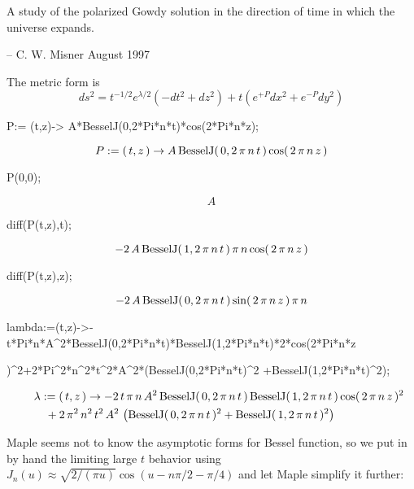 
A study of the polarized Gowdy solution in the direction of time in which the universe 
expands.

-- C. W. Misner   August 1997


The metric form is  
$$
   ds^2 = t^{-1/2} e^{\lambda/2}(-dt^2 + dz^2) 
         + t( e^{+P} dx^2 + e^{-P} dy^2)
$$

\begin{mapleinput}
P:= (t,z)-> A*BesselJ(0,2*Pi*n*t)*cos(2*Pi*n*z);
\end{mapleinput}
\begin{maplelatex}
\[
{P} := (\,{t}, {z}\,) \rightarrow {A}\,{\rm BesselJ}(\,0, 2\,{ 
\pi}\,{n}\,{t}\,)\,{\rm cos}(\,2\,{ \pi}\,{n}\,{z}\,)
\]
\end{maplelatex}
\begin{mapleinput}
P(0,0);
\end{mapleinput}
\begin{maplelatex}
\[
{A}
\]
\end{maplelatex}
\begin{mapleinput}
diff(P(t,z),t);
\end{mapleinput}
\begin{maplelatex}
\[
 - 2\,{A}\,{\rm BesselJ}(\,1, 2\,{ \pi}\,{n}\,{t}\,)\,{ \pi}\,{n}
\,{\rm cos}(\,2\,{ \pi}\,{n}\,{z}\,)
\]
\end{maplelatex}
\begin{mapleinput}
diff(P(t,z),z);
\end{mapleinput}
\begin{maplelatex}
\[
 - 2\,{A}\,{\rm BesselJ}(\,0, 2\,{ \pi}\,{n}\,{t}\,)\,{\rm sin}(
\,2\,{ \pi}\,{n}\,{z}\,)\,{ \pi}\,{n}
\]
\end{maplelatex}
\begin{mapleinput}
lambda:=(t,z)->-t*Pi*n*A^2*BesselJ(0,2*Pi*n*t)*BesselJ(1,2*Pi*n*t)*2*cos(2*Pi*n*z
\end{mapleinput}
\begin{mapleinput}
)^2+2*Pi^2*n^2*t^2*A^2*(BesselJ(0,2*Pi*n*t)^2 +BesselJ(1,2*Pi*n*t)^2);
\end{mapleinput}
\begin{maplelatex}
\begin{eqnarray*}
\lefteqn{{ \lambda} := (\,{t}, {z}\,) \rightarrow  - 2\,{t}\,{ 
\pi}\,{n}\,{A}^{2}\,{\rm BesselJ}(\,0, 2\,{ \pi}\,{n}\,{t}\,)\,
{\rm BesselJ}(\,1, 2\,{ \pi}\,{n}\,{t}\,)\,{\rm cos}(\,2\,{ \pi}
\,{n}\,{z}\,)^{2}} \\
 & & \mbox{} + 2\,{ \pi}^{2}\,{n}^{2}\,{t}^{2}\,{A}^{2}\, \left( 
\! \,{\rm BesselJ}(\,0, 2\,{ \pi}\,{n}\,{t}\,)^{2} + {\rm BesselJ
}(\,1, 2\,{ \pi}\,{n}\,{t}\,)^{2}\, \!  \right) 
\mbox{\hspace{46pt}}
\end{eqnarray*}
\end{maplelatex}
Maple seems not to know the asymptotic forms for Bessel function, so we put in
by hand the limiting large $t$ behavior using $J_n(u) \approx \sqrt{2/(\pi u)}
\cos(u - n \pi/2 - \pi/4)$ and let Maple simplify it further:

